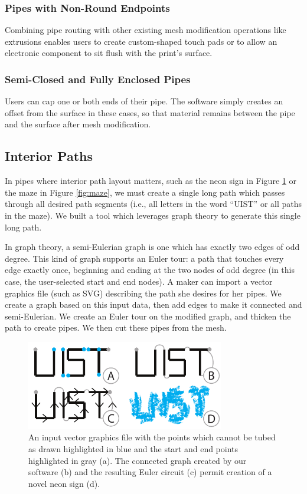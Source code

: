 \subsubsection{Pipes with Non-Round Endpoints}
Combining pipe routing with other existing mesh modification operations like extrusions enables users to create custom-shaped touch pads or to allow an electronic component to sit flush with the print's surface.

\subsubsection{Semi-Closed and Fully Enclosed Pipes}
Users can cap one or both ends of their pipe.  The software simply creates an offset from the surface in these cases, so that material remains between the pipe and the surface after mesh modification.

\subsection{Interior Paths}

In pipes where interior path layout matters, such as the neon sign in Figure \ref{fig:tool-process-interior} or the maze in Figure \ref{fig:maze}, we must create a single long path which passes through all desired path segments (i.e., all letters in the word ``UIST'' or all paths in the maze).  We built a tool which leverages graph theory to generate this single long path.

In graph theory, a semi-Eulerian graph is one which has exactly two edges of odd degree.  This kind of graph supports an Euler tour: a path that touches every edge exactly once, beginning and ending at the two nodes of odd degree (in this case, the user-selected start and end nodes).  A maker can import a vector graphics file (such as SVG) describing the path she desires for her pipes.  We create a graph based on this input data, then add edges to make it connected and semi-Eulerian.  We create an Euler tour on the modified graph, and thicken the path to create pipes.  We then cut these pipes from the mesh.

\begin{figure}[h!]
\centering
    \includegraphics[width=3.4in]{figures/interior.pdf}
\caption{An input vector graphics file with the points which cannot be tubed as drawn highlighted in {\color{blue}blue} and the start and end points highlighted in {\color{gray}gray} (a).  The connected graph created by our software (b) and the resulting Euler circuit (c) permit creation of a novel neon sign (d).}
\label{fig:tool-process-interior}
\end{figure}

